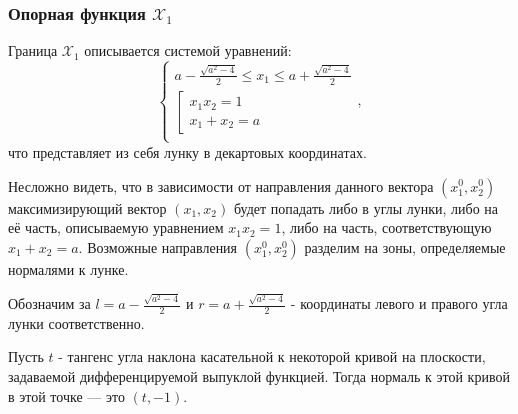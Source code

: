 \documentclass[11pt]{article}
\begin{document}
\subsubsection{Опорная функция $\mathcal{X}_1$}
Граница $\mathcal{X}_1$ описывается системой уравнений:
$$
\left\{
\begin{aligned}
a - \frac{\sqrt{a^2 - 4}}{2} \leqslant x_1 \leqslant a + \frac{\sqrt{a^2 - 4}}{2} \\
\left[
\begin{aligned}
x_1 x_2 = 1 \\
x_1 + x_2 = a
\end{aligned}
\right. \\
\end{aligned}
\right.,
$$
что представляет из себя лунку в декартовых координатах.

Несложно видеть, что в зависимости от направления данного вектора $\left(x_1^0, x_2^0 \right)$ максимизирующий вектор $\left(x_1, x_2 \right)$ будет попадать либо в углы лунки, либо на её часть, описываемую уравнением $x_1 x_2 = 1$, либо на часть, соответствующую $x_1 + x_2 = a$. Возможные направления $\left(x_1^0, x_2^0 \right)$ разделим на зоны, определяемые нормалями к лунке.

Обозначим за $l = a - \tfrac{\sqrt{a^2 - 4}}{2}$ и $r = a + \tfrac{\sqrt{a^2 - 4}}{2}$ - координаты левого и правого угла лунки соответственно.

Пусть $t$ - тангенс угла наклона касательной к некоторой кривой на плоскости, задаваемой дифференцируемой выпуклой функцией. Тогда нормаль к этой кривой в этой точке --- это $\left( t, -1 \right)$.
\end{document}
